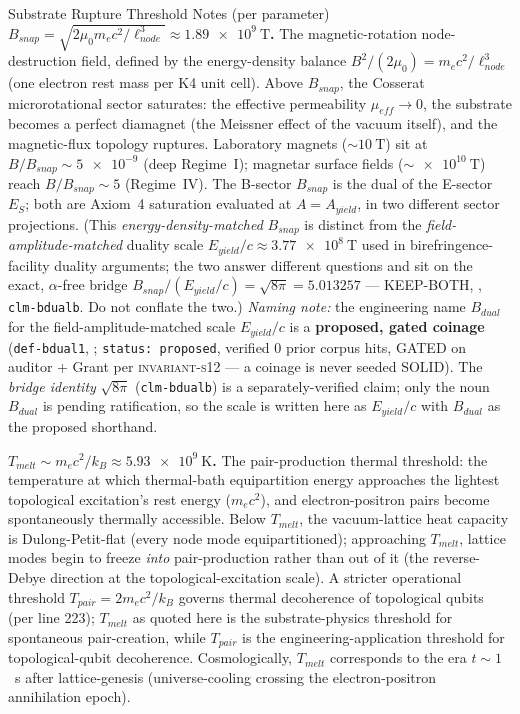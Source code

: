 \begin{resultbox}{Substrate Rupture Threshold Notes (per parameter)}
\medskip
\noindent\textbf{$B_{snap} = \sqrt{2\mu_0 m_e c^2 / \ell_{node}^3} \approx \qty{1.89e9}{\tesla}$.} The magnetic-rotation node-destruction field, defined by the energy-density balance $B^2/(2\mu_0) = m_e c^2/\ell_{node}^3$ (one electron rest mass per K4 unit cell). Above $B_{snap}$, the Cosserat microrotational sector saturates: the effective permeability $\mu_{eff} \to 0$, the substrate becomes a perfect diamagnet (the Meissner effect of the vacuum itself), and the magnetic-flux topology ruptures. Laboratory magnets ($\sim \qty{10}{\tesla}$) sit at $B/B_{snap} \sim \num{5e-9}$ (deep Regime~I); magnetar surface fields ($\sim \qty{e10}{\tesla}$) reach $B/B_{snap} \sim 5$ (Regime~IV). The B-sector $B_{snap}$ is the dual of the E-sector $E_S$; both are Axiom~4 saturation evaluated at $A = A_{yield}$, in two different sector projections. (This \emph{energy-density-matched} $B_{snap}$ is distinct from the \emph{field-amplitude-matched} duality scale $E_{yield}/c \approx \qty{3.77e8}{\tesla}$ used in birefringence-facility duality arguments; the two answer different questions and sit on the exact, $\alpha$-free bridge $B_{snap}/(E_{yield}/c) = \sqrt{8\pi} = 5.013257$ --- KEEP-BOTH, , \texttt{clm-bdualb}. Do not conflate the two.) \emph{Naming note:} the engineering name $B_{dual}$ for the field-amplitude-matched scale $E_{yield}/c$ is a \textbf{proposed, gated coinage} (\texttt{def-bdual1}, ; \texttt{status: proposed}, verified 0 prior corpus hits, GATED on auditor + Grant per \textsc{invariant-s12} --- a coinage is never seeded SOLID). The \emph{bridge identity} $\sqrt{8\pi}$ (\texttt{clm-bdualb}) is a separately-verified claim; only the noun $B_{dual}$ is pending ratification, so the scale is written here as $E_{yield}/c$ with $B_{dual}$ as the proposed shorthand.

\medskip
\noindent\textbf{$T_{melt} \sim m_e c^2 / k_B \approx \qty{5.93e9}{\kelvin}$.} The pair-production thermal threshold: the temperature at which thermal-bath equipartition energy approaches the lightest topological excitation's rest energy ($m_e c^2$), and electron-positron pairs become spontaneously thermally accessible. Below $T_{melt}$, the vacuum-lattice heat capacity is Dulong-Petit-flat (every node mode equipartitioned); approaching $T_{melt}$, lattice modes begin to freeze \emph{into} pair-production rather than out of it (the reverse-Debye direction at the topological-excitation scale). A stricter operational threshold $T_{pair} = 2 m_e c^2/k_B$ governs thermal decoherence of topological qubits (per  line 223); $T_{melt}$ as quoted here is the substrate-physics threshold for spontaneous pair-creation, while $T_{pair}$ is the engineering-application threshold for topological-qubit decoherence. Cosmologically, $T_{melt}$ corresponds to the era $t \sim 1$~s after lattice-genesis (universe-cooling crossing the electron-positron annihilation epoch).

\end{resultbox}

